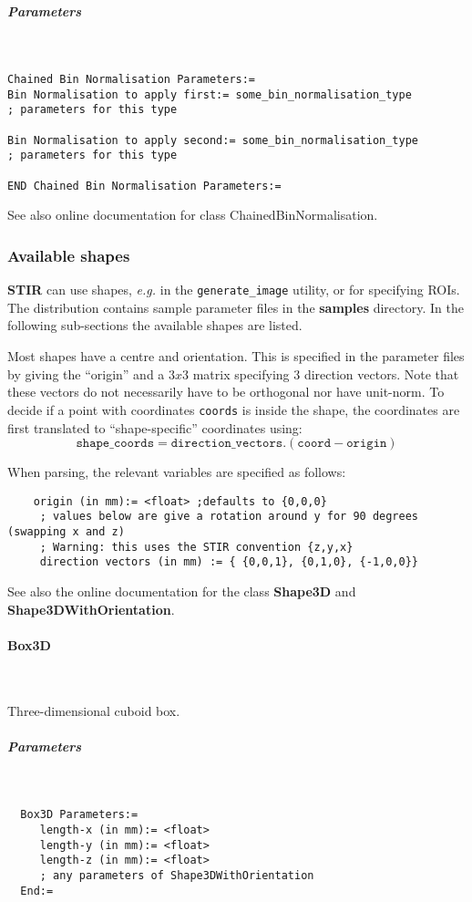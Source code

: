 \documentclass{article}
\newcommand{\subsubsubsection}[1]{\paragraph{#1}\mbox{} \\}
\newcommand{\subsubsubsubsection}[1]{\subparagraph{#1} \mbox{} \\}
\begin{document}
{{{{ \subsubsubsubsection{Parameters}
}
\begin{verbatim}
Chained Bin Normalisation Parameters:=
Bin Normalisation to apply first:= some_bin_normalisation_type
; parameters for this type

Bin Normalisation to apply second:= some_bin_normalisation_type
; parameters for this type

END Chained Bin Normalisation Parameters:=
\end{verbatim}

See also online documentation for class ChainedBinNormalisation.

\subsubsection{
Available shapes}
\label{sec:shapes}
\textbf{STIR} can use shapes, \textit{e.g.} in the \texttt{generate\_image}
utility, or for specifying ROIs. The distribution contains sample parameter files in the
\textbf{samples} directory. In the following sub-sections the available shapes are listed.

Most shapes have a centre and orientation. This is specified in the parameter files
by giving the ``origin'' and a $3x3$ matrix specifying $3$ direction vectors.
Note that these vectors do not necessarily have to be orthogonal nor have unit-norm.
To decide if a point with coordinates \texttt{coords} is inside the shape, the
coordinates are first translated to ``shape-specific'' coordinates using:
\[
\mathtt{shape\_coords} = \mathtt{direction\_vectors}. (\mathtt{coord}-\mathtt{origin})
\]

When parsing, the relevant variables are specified as follows:
\begin{verbatim}
    origin (in mm):= <float> ;defaults to {0,0,0}
     ; values below are give a rotation around y for 90 degrees (swapping x and z)
     ; Warning: this uses the STIR convention {z,y,x}
     direction vectors (in mm) := { {0,0,1}, {0,1,0}, {-1,0,0}}
\end{verbatim}

See also the online documentation for the class \textbf{Shape3D} and
\textbf{Shape3DWithOrientation}.

{ \subsubsubsection{Box3D}
}
Three-dimensional cuboid box.
{ \subsubsubsubsection{Parameters}
}
\begin{verbatim}
  Box3D Parameters:=
     length-x (in mm):= <float>
     length-y (in mm):= <float>
     length-z (in mm):= <float>
     ; any parameters of Shape3DWithOrientation
  End:=
\end{verbatim}

}}}
\end{document}
